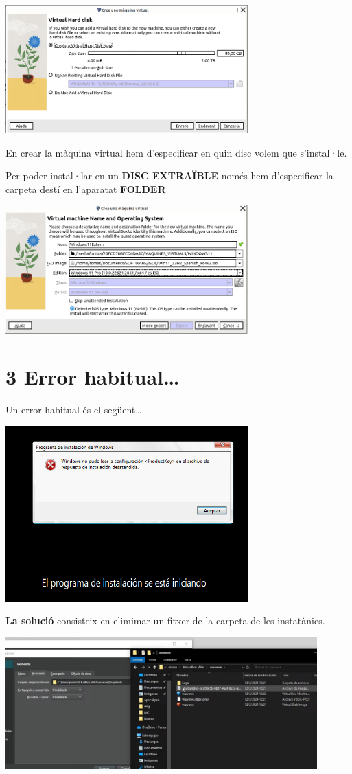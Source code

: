 \documentclass[
  a4paper,
]{article}
\begin{document}
\includegraphics[width=0.7\textwidth,height=\textheight]{png/Hardware2.png}

En crear la màquina virtual hem d'especificar en quin disc volem que
s'instal·le.

Per poder instal·lar en un \textbf{DISC EXTRAÏBLE} només hem
d'especificar la carpeta destí en l'aparatat \textbf{FOLDER}

\includegraphics[width=0.7\textwidth,height=\textheight]{png/SeleccioCarpetaDesti.png}

\section{3 Error habitual\ldots{}}\label{error-habitual}

Un error habitual és el següent\ldots{}

\includegraphics[width=0.7\textwidth,height=\textheight]{png/errorInstalacio.png}

\textbf{La solució} consisteix en elimimar un fitxer de la carpeta de
les instatànies.

\includegraphics[width=0.9\textwidth,height=\textheight]{png/unattendedEliminar.png}
\end{document}
